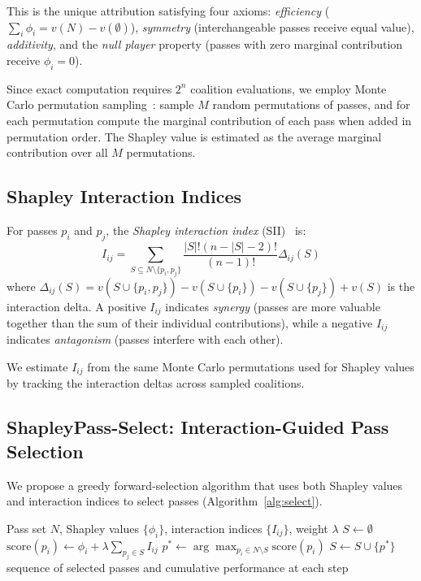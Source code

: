 \documentclass{article}
\newcommand{\sv}{\phi}
\newcommand{\sii}{I}
\newcommand{\coal}{S}
\newcommand{\passes}{N}
\newcommand{\val}{v}
\begin{document}
This is the unique attribution satisfying four axioms: \emph{efficiency} ($\sum_i \sv_i = \val(\passes) - \val(\emptyset)$), \emph{symmetry} (interchangeable passes receive equal value), \emph{additivity}, and the \emph{null player} property (passes with zero marginal contribution receive $\sv_i = 0$).

Since exact computation requires $2^n$ coalition evaluations, we employ Monte Carlo permutation sampling~\citep{castro2009polynomial}: sample $M$ random permutations of passes, and for each permutation compute the marginal contribution of each pass when added in permutation order. The Shapley value is estimated as the average marginal contribution over all $M$ permutations.

\subsection{Shapley Interaction Indices}

For passes $p_i$ and $p_j$, the \emph{Shapley interaction index} (SII)~\citep{grabisch1999axiomatic} is:
\begin{equation}
    \sii_{ij} = \sum_{\coal \subseteq \passes \setminus \{p_i, p_j\}} \frac{|\coal|!(n-|\coal|-2)!}{(n-1)!} \Delta_{ij}(\coal)
\label{eq:sii}
\end{equation}
where $\Delta_{ij}(\coal) = \val(\coal \cup \{p_i, p_j\}) - \val(\coal \cup \{p_i\}) - \val(\coal \cup \{p_j\}) + \val(\coal)$ is the interaction delta. A positive $\sii_{ij}$ indicates \emph{synergy} (passes are more valuable together than the sum of their individual contributions), while a negative $\sii_{ij}$ indicates \emph{antagonism} (passes interfere with each other).

We estimate $\sii_{ij}$ from the same Monte Carlo permutations used for Shapley values by tracking the interaction deltas across sampled coalitions.

\subsection{ShapleyPass-Select: Interaction-Guided Pass Selection}

We propose a greedy forward-selection algorithm that uses both Shapley values and interaction indices to select passes (Algorithm~\ref{alg:select}).

\begin{algorithm}[t]
\caption{\textsc{ShapleyPass-Select}}
\label{alg:select}
\begin{algorithmic}[1]
\REQUIRE Pass set $\passes$, Shapley values $\{\sv_i\}$, interaction indices $\{\sii_{ij}\}$, weight $\lambda$
\STATE $\coal \leftarrow \emptyset$
\FOR{$k = 1$ to $|\passes|$}
    \FOR{each $p_i \in \passes \setminus \coal$}
        \STATE $\text{score}(p_i) \leftarrow \sv_i + \lambda \sum_{p_j \in \coal} \sii_{ij}$
    \ENDFOR
    \STATE $p^* \leftarrow \arg\max_{p_i \in \passes \setminus \coal} \text{score}(p_i)$
    \STATE $\coal \leftarrow \coal \cup \{p^*\}$
\ENDFOR
\RETURN sequence of selected passes and cumulative performance at each step
\end{algorithmic}
\end{algorithm}
\end{document}
